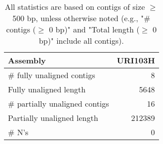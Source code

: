 \documentclass[12pt,a4paper]{article}
\begin{document}
\begin{table}[ht]
\begin{center}
\caption{All statistics are based on contigs of size $\geq$ 500 bp, unless otherwise noted (e.g., "\# contigs ($\geq$ 0 bp)" and "Total length ($\geq$ 0 bp)" include all contigs).}
\begin{tabular}{|l*{1}{|r}|}
\hline
Assembly & URI103H \\ \hline
\# fully unaligned contigs & 8 \\ \hline
Fully unaligned length & 5648 \\ \hline
\# partially unaligned contigs & 16 \\ \hline
Partially unaligned length & 212389 \\ \hline
\# N's & 0 \\ \hline
\end{tabular}
\end{center}
\end{table}
\end{document}
